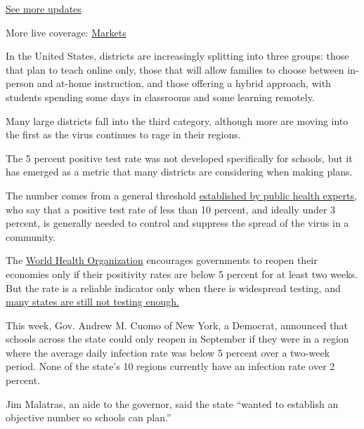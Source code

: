 \href{https://www.nytimes3xbfgragh.onion/2020/08/01/world/coronavirus-covid-19.html?action=click\&pgtype=Article\&state=default\&region=MAIN_CONTENT_1\&context=storylines_live_updates}{See
more updates}

More live coverage:
\href{https://www.nytimes3xbfgragh.onion/live/2020/07/31/business/stock-market-today-coronavirus?action=click\&pgtype=Article\&state=default\&region=MAIN_CONTENT_1\&context=storylines_live_updates}{Markets}

In the United States, districts are increasingly splitting into three
groups: those that plan to teach online only, those that will allow
families to choose between in-person and at-home instruction, and those
offering a hybrid approach, with students spending some days in
classrooms and some learning remotely.

Many large districts fall into the third category, although more are
moving into the first as the virus continues to rage in their regions.

The 5 percent positive test rate was not developed specifically for
schools, but it has emerged as a metric that many districts are
considering when making plans.

The number comes from a general threshold
\href{https://globalepidemics.org/wp-content/uploads/2020/06/key_metrics_and_indicators_v4.pdf}{established
by public health experts}, who say that a positive test rate of less
than 10 percent, and ideally under 3 percent, is generally needed to
control and suppress the spread of the virus in a community.

The \href{https://coronavirus.jhu.edu/testing/testing-positivity}{World
Health Organization} encourages governments to reopen their economies
only if their positivity rates are below 5 percent for at least two
weeks. But the rate is a reliable indicator only when there is
widespread testing, and
\href{https://www.nytimes3xbfgragh.onion/interactive/2020/us/coronavirus-testing.html}{many
states are still not testing enough.}

This week, Gov. Andrew M. Cuomo of New York, a Democrat, announced that
schools across the state could only reopen in September if they were in
a region where the average daily infection rate was below 5 percent over
a two-week period. None of the state's 10 regions currently have an
infection rate over 2 percent.

Jim Malatras, an aide to the governor, said the state ``wanted to
establish an objective number so schools can plan.''

